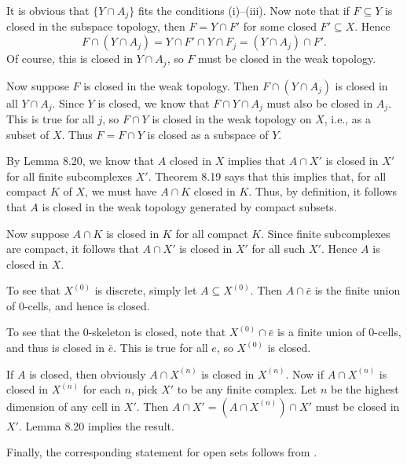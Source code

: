 \documentclass[../../solutions.tex]{subfiles}
\begin{document}
\begin{exercise} \leavevmode
It is obvious that $\{Y\cap A_j\}$ fits the conditions (i)--(iii).
Now note that if $F\subseteq Y$ is closed in the subspace topology, then $F=Y\cap F'$ for some closed $F'\subseteq X$.
Hence
\[F\cap(Y\cap A_j)=Y\cap F'\cap Y\cap F_j=(Y\cap A_j)\cap F'.\]
Of course, this is closed in $Y\cap A_j$, so $F$ must be closed in the weak topology.

Now suppose $F$ is closed in the weak topology.
Then $F\cap(Y\cap A_j)$ is closed in all $Y\cap A_j$.
Since $Y$ is closed, we know that $F\cap Y\cap A_j$ must also be closed in $A_j$.
This is true for all $j$, so $F\cap Y$ is closed in the weak topology on $X$, i.e., as a subset of $X$.
Thus $F=F\cap Y$ is closed as a subspace of $Y$.
\end{exercise}

\begin{exercise} \leavevmode
By Lemma 8.20, we know that $A$ closed in $X$ implies that $A\cap X'$ is closed in $X'$ for all finite subcomplexes $X'$.
Theorem 8.19 says that this implies that, for all compact $K$ of $X$, we must have $A\cap K$ closed in $K$.
Thus, by definition, it follows that $A$ is closed in the weak topology generated by compact subsets.

Now suppose $A\cap K$ is closed in $K$ for all compact $K$.
Since finite subcomplexes are compact, it follows that $A\cap X'$ is closed in $X'$ for all such $X'$.
Hence $A$ is closed in $X$.
\end{exercise}

\begin{exercise} \leavevmode
To see that $X^{(0)}$ is discrete, simply let $A\subseteq X^{(0)}$.
Then $A\cap\bar e$ is the finite union of 0-cells, and hence is closed.

To see that the 0-skeleton is closed, note that $X^{(0)}\cap\bar e$ is a finite union of 0-cells, and thus is closed in $\bar e$.
This is true for all $e$, so $X^{(0)}$ is closed.
\end{exercise}

\begin{exercise} \leavevmode
If $A$ is closed, then obviously $A\cap X^{(n)}$ is closed in $X^{(n)}$.
Now if $A\cap X^{(n)}$ is closed in $X^{(n)}$ for each $n$, pick $X'$ to be any finite complex.
Let $n$ be the highest dimension of any cell in $X'$.
Then $A\cap X'=(A\cap X^{(n)})\cap X'$ must be closed in $X'$.
Lemma 8.20 implies the result.

Finally, the corresponding statement for open sets follows from .
\end{exercise}
\end{document}
